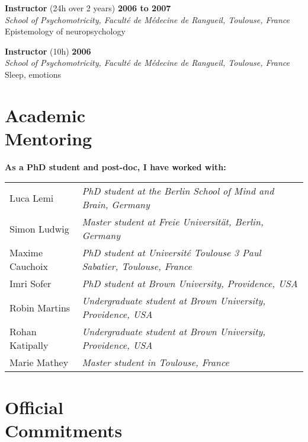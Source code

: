 \documentclass[margin,line]{resume}
\begin{document}
\begin{resume}
	\textbf{Instructor} (24h over 2 years) \hfill \textbf{2006 to 2007}\\
	\textsl{School of Psychomotricity, Faculté de Médecine de Rangueil, Toulouse, France}\\
	Epistemology of neuropsychology

	\textbf{Instructor} (10h) \hfill \textbf{2006}\\
	\textsl{School of Psychomotricity, Faculté de Médecine de Rangueil, Toulouse, France}\\
	Sleep, emotions


	\vspace{3mm}
    \section{\mysidestyle Academic\\Mentoring}
	
	\textbf{As a PhD student and post-doc, I have worked with:}\\
	\begin{tabular}{@{}ll} %
	Luca Lemi       & \textsl{PhD student at the Berlin School of Mind and Brain, Germany}\\
	Simon Ludwig    & \textsl{Master student at Freie Universität, Berlin, Germany}\\
	Maxime Cauchoix & \textsl{PhD student at Université Toulouse 3 Paul Sabatier, Toulouse, France}\\
	Imri Sofer      & \textsl{PhD student at Brown University, Providence, USA}\\
	Robin Martins   & \textsl{Undergraduate student at Brown University, Providence, USA} \\
	Rohan Katipally & \textsl{Undergraduate student at Brown University, Providence, USA} \\
	Marie Mathey    & \textsl{Master student in Toulouse, France}
	\end{tabular}
	
\newpage

	\vspace{3mm}
    \section{\mysidestyle Official\\ Commitments} %
	

\end{resume}
\end{document}

